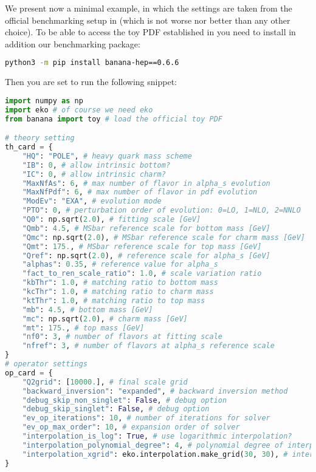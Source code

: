 We present now a minimal example, in which the settings are taken from the official
benchmarking setup in \cite{Giele:2002hx} (which is not worse nor better than any other choice).
To be able to access the toy PDF established in \cite{Giele:2002hx} you need to install in addition our benchmarking package:
\begin{lstlisting}[language=sh]
    python3 -m pip install banana-hep==0.6.6
\end{lstlisting}
Then you are set to run the following snippet:
\begin{lstlisting}[language=Python]
import numpy as np
import eko # of course we need eko
from banana import toy # load the official toy PDF

# theory setting
th_card = {
    "HQ": "POLE", # heavy quark mass scheme
    "IB": 0, # allow intrinsic bottom?
    "IC": 0, # allow intrinsic charm?
    "MaxNfAs": 6, # max number of flavor in alpha_s evolution
    "MaxNfPdf": 6, # max number of flavor in pdf evolution
    "ModEv": "EXA", # evolution mode
    "PTO": 0, # perturbation order of evolution: 0=LO, 1=NLO, 2=NNLO
    "Q0": np.sqrt(2.0), # fitting scale [GeV]
    "Qmb": 4.5, # MSbar reference scale for bottom mass [GeV]
    "Qmc": np.sqrt(2.0), # MSbar reference scale for charm mass [GeV]
    "Qmt": 175., # MSbar reference scale for top mass [GeV]
    "Qref": np.sqrt(2.0), # reference scale for alpha_s [GeV]
    "alphas": 0.35, # reference value for alpha_s
    "fact_to_ren_scale_ratio": 1.0, # scale variation ratio
    "kbThr": 1.0, # matching ratio to bottom mass
    "kcThr": 1.0, # matching ratio to charm mass
    "ktThr": 1.0, # matching ratio to top mass
    "mb": 4.5, # bottom mass [GeV]
    "mc": np.sqrt(2.0), # charm mass [GeV]
    "mt": 175., # top mass [GeV]
    "nf0": 3, # number of flavors at fitting scale
    "nfref": 3, # number of flavors at alpha_s reference scale
}
# operator settings
op_card = {
    "Q2grid": [10000.], # final scale grid
    "backward_inversion": "expanded", # backward inversion method
    "debug_skip_non_singlet": False, # debug option
    "debug_skip_singlet": False, # debug option
    "ev_op_iterations": 10, # number of iterations for solver
    "ev_op_max_order": 10, # expansion order of solver
    "interpolation_is_log": True, # use logarithmic interpolation?
    "interpolation_polynomial_degree": 4, # polynomial degree of interpolation
    "interpolation_xgrid": eko.interpolation.make_grid(30, 30), # interpolation grid ranging from 1e-7 to 1
}


\end{lstlisting}
